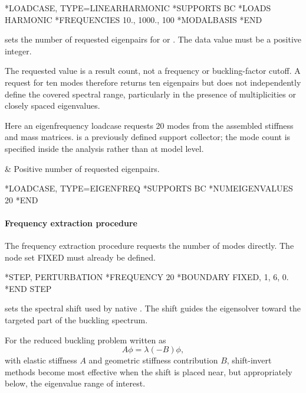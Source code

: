 \exampleheading
\begin{inputdeck}
*LOADCASE, TYPE=LINEARHARMONIC
*SUPPORTS
BC
*LOADS
HARMONIC
*FREQUENCIES
10., 1000., 100
*MODALBASIS
*END
\end{inputdeck}


 sets the number of requested eigenpairs for  or . The data value must be a positive integer.

The requested value is a result count, not a frequency or buckling-factor cutoff. A request for ten modes therefore returns ten eigenpairs but does not independently define the covered spectral range, particularly in the presence of multiplicities or closely spaced eigenvalues.

Here an eigenfrequency loadcase requests 20 modes from the
assembled stiffness and mass matrices.  is a previously
defined support collector; the mode count is specified inside
the analysis rather than at model level.

\begin{keyworddata}
 & Positive number of requested eigenpairs. \\
\end{keyworddata}

\exampleheading
\begin{inputdeck}
*LOADCASE, TYPE=EIGENFREQ
*SUPPORTS
BC
*NUMEIGENVALUES
20
*END
\end{inputdeck}

\paragraph*{Frequency extraction procedure}

The frequency extraction procedure requests the number of modes directly. The node set FIXED must already be defined.
\begin{inputdeck}
*STEP, PERTURBATION
*FREQUENCY
20
*BOUNDARY
FIXED, 1, 6, 0.
*END STEP
\end{inputdeck}


 sets the spectral shift used by native . The shift guides the eigensolver toward the targeted part of the buckling spectrum.

For the reduced buckling problem written as
\[
A\phi=\lambda(-B)\phi,
\]
with elastic stiffness \(A\) and geometric stiffness contribution \(B\), shift-invert methods become most effective when the shift is placed near, but appropriately below, the eigenvalue range of interest.

